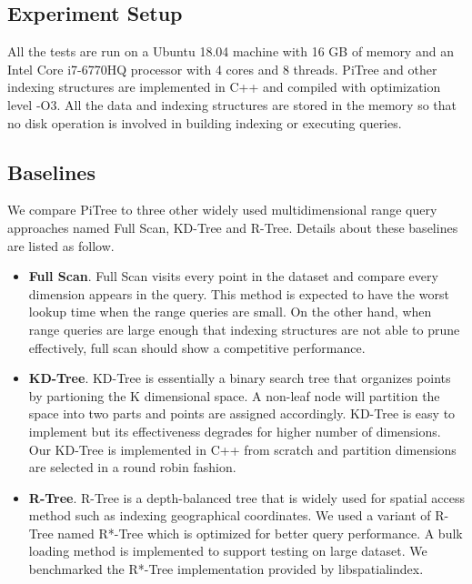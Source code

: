 \documentclass[sigconf,10pt]{acmart}
\begin{document}
\subsection{Experiment Setup}

All the tests are run on a Ubuntu 18.04 machine with 16 GB of memory and an Intel 
Core i7-6770HQ processor with 4 cores and 8 threads. PiTree and other indexing 
structures are implemented in C++ and compiled with optimization level -O3. 
All the data and indexing structures are stored in the memory so that no disk 
operation is involved in building indexing or executing queries.

\subsection{Baselines}

We compare PiTree to three other widely used multidimensional range query approaches 
named Full Scan, KD-Tree and R-Tree. Details about these baselines are listed 
as follow. 
\begin{itemize}
    \item \textbf{Full Scan}. Full Scan visits every point in the dataset and 
    compare every dimension appears in the query. This method is expected to have 
    the worst lookup time when the range queries are small. On the other hand, 
    when range queries are large enough that indexing structures are not able to 
    prune effectively, full scan should show a competitive performance.
    \item \textbf{KD-Tree}. KD-Tree is essentially a binary search tree that organizes
    points by partioning the K dimensional space. A non-leaf node will partition 
    the space into two parts and points are assigned accordingly. KD-Tree is easy to 
    implement but its effectiveness degrades for higher number of dimensions. Our KD-Tree is
    implemented in C++ from scratch and partition dimensions are selected in a round robin fashion.
    \item \textbf{R-Tree}. R-Tree is a depth-balanced tree that is widely used for spatial
    access method such as indexing geographical coordinates. We used a variant of R-Tree named
    R*-Tree which is optimized for better query performance. A bulk loading method is
    implemented to support testing on large dataset. We benchmarked the R*-Tree implementation
    provided by libspatialindex.\cite{libSpatialIndex}

\end{itemize}
\end{document}
